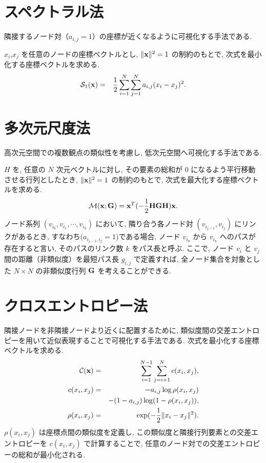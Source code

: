 \documentclass[a4paper,12pt]{jsreport}
\begin{document}
\section{スペクトラル法}

隣接するノード対（$a_{i,j}=1$）の座標が近くなるように可視化する手法である.  

$x_i$,$x_j$ を任意のノードの座標ベクトルとし, $\|{\bf x}\|^2 = 1$ の制約のもとで, 次式を最小化する座標ベクトルを求める.  
\begin{eqnarray}
{\cal S}_1({\bf x}) & = & \frac{1}{2} \sum_{i=1}^{N} \sum_{j=1}^{N} a_{i,j} (x_i - x_j)^2. 
\label{spectral01}
\end{eqnarray}

\section{多次元尺度法}

高次元空間での複数観点の類似性を考慮し, 低次元空間へ可視化する手法である.

$H$ を, 任意の $N$ 次元ベクトルに対し, その要素の総和が $0$ になるよう平行移動させる行列としたとき,
$\|{\bf x}\|^2 = 1$ の制約のもとで, 次式を最大化する座標ベクトルを求める. 
\begin{eqnarray}
{\cal M}({\bf x}; {\bf G}) =  {\bf x}^T (-\frac{1}{2}{\bf H} {\bf G} {\bf H}) {\bf x}.
\label{MDS1}
\end{eqnarray}
ノード系列 $(v_{i_0}, v_{i_1}, \cdots, v_{i_k})$ において, 
隣り合う各ノード対 $(v_{i_{j-1}}, v_{i_j})$ にリンクがあるとき,
すなわち($a_{i_{j-1},i_j} = 1$)である場合, 
ノード $v_{i_0}$ から $v_{i_k}$ へのパスが存在すると言い, 
そのパスのリンク数 $k$ をパス長と呼ぶ. 
ここで, ノード $v_i$ と $v_j$ 間の距離（非類似度）を最短パス長 $g_{i,j}$ で定義すれば, 
全ノード集合を対象とした $N \times N$ の非類似度行列 ${\bf G}$ を考えることができる. 

\section{クロスエントロピー法} 

隣接ノードを非隣接ノードより近くに配置するために,
類似度間の交差エントロピーを用いて近似表現することで可視化する手法である.
次式を最小化する座標ベクトルを求める. 
\begin{eqnarray}
{\cal C}({\bf x}) & = & \sum_{i=1}^{N-1} \sum_{j=i+1}^{N} c(x_i, x_j), \label{cross} \\
c(x_i, x_j) & = & - a_{i,j} \log \rho(x_i, x_j) \label{cross2} \\
            &   & - (1-a_{i,j})\log(1-\rho(x_i, x_j)), \nonumber\\
\rho(x_i, x_j) & = & \exp(-\frac{1}{2} \|x_i - x_j\|^2). \label{neibor}
\end{eqnarray}
$\rho(x_i, x_j)$ は座標点間の類似度を定義し, 
この類似度と隣接行列要素との交差エントロピーを $c(x_i, x_j)$ で計算することで, 
任意のノード対での交差エントロピーの総和が最小化される. 
\end{document}
